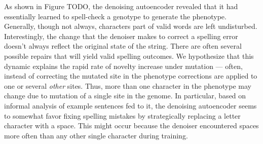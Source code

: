 As shown in Figure TODO, the denoising autoencoder revealed that it had essentially learned to spell-check a genotype to generate the phenotype.
Generally, though not always, characters part of valid words are left undisturbed.
Interestingly, the change that the denoiser makes to correct a spelling error doesn't always reflect the original state of the string.
There are often several possible repairs that will yield valid spelling outcomes.
We hypothesize that this dynamic explains the rapid rate of novelty increase under mutation --- often, instead of correcting the mutated site in the phenotype corrections are applied to one or several \textit{other} sites.
Thus, more than one character in the phenotype may change due to mutation of a single site in the genome.
In particular, based on informal analysis of example sentences fed to it, the denoising autoencoder seems to somewhat favor fixing spelling mistakes by strategically replacing a letter character with a space.
This might occur because the denoiser encountered spaces more often than any other single character during training.
